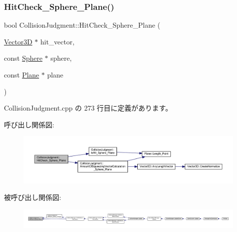 \subsubsection{\texorpdfstring{Hit\+Check\+\_\+\+Sphere\+\_\+\+Plane()}{HitCheck\_Sphere\_Plane()}}
{\footnotesize\ttfamily bool Collision\+Judgment\+::\+Hit\+Check\+\_\+\+Sphere\+\_\+\+Plane (\begin{DoxyParamCaption}\item[{\mbox{\hyperlink{class_vector3_d}{Vector3D}} $\ast$}]{hit\+\_\+vector,  }\item[{const \mbox{\hyperlink{class_sphere}{Sphere}} $\ast$}]{sphere,  }\item[{const \mbox{\hyperlink{class_plane}{Plane}} $\ast$}]{plane }\end{DoxyParamCaption})\hspace{0.3cm}{\ttfamily [static]}}



 Collision\+Judgment.\+cpp の 273 行目に定義があります。

呼び出し関係図\+:\nopagebreak
\begin{figure}[H]
\begin{center}
\leavevmode
\includegraphics[width=350pt]{class_collision_judgment_a47628fb2aef868f75942f378f63478cc_cgraph}
\end{center}
\end{figure}
被呼び出し関係図\+:
\nopagebreak
\begin{figure}[H]
\begin{center}
\leavevmode
\includegraphics[width=350pt]{class_collision_judgment_a47628fb2aef868f75942f378f63478cc_icgraph}
\end{center}
\end{figure}
\mbox{\label{class_collision_judgment_a21e4ce202f713f1b2a7fc593f4daf7d2}} 
